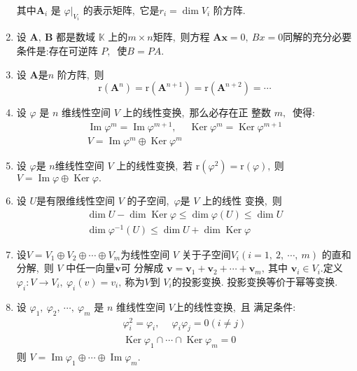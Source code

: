\begin{enumerate}
		其中$  \boldsymbol{A}_{i} $ 是  $\left.\varphi\right|_{V_{i}} $ 的表示矩阵,\  它是$  r_{i}=\operatorname{dim} V_{i} $ 阶方阵.
		\item 设  $\boldsymbol{A},\  \boldsymbol{B} $ 都是数域 $ \mathbb{K} $ 上的$  m \times n  $矩阵,\  则方程  $\boldsymbol{A x}=   0,\  B x=0  $同解的充分必要条件是:存在可逆阵  $P ,\ $ 使$  B=P A .$
		\item 设 $ \boldsymbol{A}  $是$  n $ 阶方阵,\  则
		$$\mathrm{r}\left(\boldsymbol{A}^{n}\right)=\mathrm{r}\left(\boldsymbol{A}^{n+1}\right)=\mathrm{r}\left(\boldsymbol{A}^{n+2}\right)=\cdots$$
		\item 设  $\varphi$  是  $n $ 维线性空间 $ V$  上的线性变换,\  那么必存在正 整数 $ m ,\ $ 使得:
		$$\begin{array}{c}
			\operatorname{Im} \varphi^{m}=\operatorname{Im} \varphi^{m+1},\  \quad \operatorname{Ker} \varphi^{m}=\operatorname{Ker} \varphi^{m+1} \\
			V=\operatorname{Im} \varphi^{m} \oplus \operatorname{Ker} \varphi^{m}
		\end{array}$$
		\item 设  $\varphi  $是  $n  $维线性空间  $V$  上的线性变换,\  若  $\mathrm{r}\left(\varphi^{2}\right)=\mathrm{r}(\varphi) ,\ $则  $V=\operatorname{Im} \varphi \oplus \operatorname{Ker} \varphi .$
		\item 设 $ U  $是有限维线性空间 $ V $ 的子空间,\ $  \varphi  $是  $V $ 上的线性 变换,\ 则
		$$\begin{array}{c}
			\operatorname{dim} U-\operatorname{dim} \operatorname{Ker} \varphi \leqslant \operatorname{dim} \varphi(U) \leqslant \operatorname{dim} U \\
			\operatorname{dim} \varphi^{-1}(U) \leqslant \operatorname{dim} U+\operatorname{dim} \operatorname{Ker} \varphi
		\end{array}$$
		\item 设$  V=V_{1} \oplus V_{2} \oplus \cdots \oplus V_{m}  $为线性空间  $V$  关于子空间$  V_{i}(i=1,\ 2,\  \cdots,\  m) $ 的直和分解,\  则  $V $ 中任一向量$  \boldsymbol{v}  $可 分解成  $\boldsymbol{v}=\boldsymbol{v}_{1}+\boldsymbol{v}_{2}+\cdots+\boldsymbol{v}_{m} ,\  $其中 $ \boldsymbol{v}_{i} \in V_{i} . $定义  $\varphi_{i}: V \rightarrow V_{i},\  \varphi_{i}(v)=v_{i} ,\  $称为$  V  $到 $ V_{i}  $的投影变换. 投影变换等价于幂等变换.
		\item 设 $ \varphi_{1},\  \varphi_{2},\  \cdots,\  \varphi_{m}$  是 $ n $ 维线性空间 $ V  $上的线性变换,\  且 满足条件:
		$$\begin{array}{c}
			\varphi_{i}^{2}=\varphi_{i},\  \quad \varphi_{i} \varphi_{j}=0(i \neq j) \\
			\operatorname{Ker} \varphi_{1} \cap \cdots \cap \operatorname{Ker} \varphi_{m}=0
		\end{array}$$
		则  $V=\operatorname{Im} \varphi_{1} \oplus \cdots \oplus \operatorname{Im} \varphi_{m} .$

\end{enumerate}
